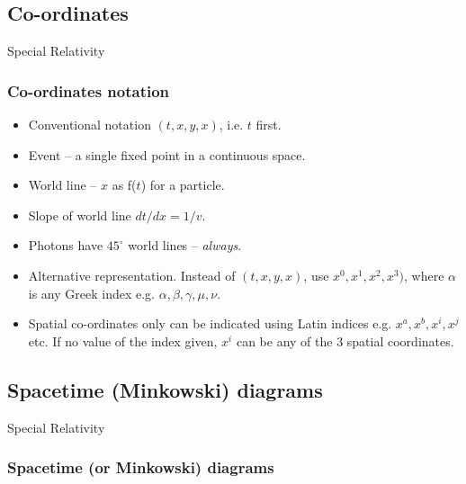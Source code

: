 \documentclass[xcolor=x11names,compress]{beamer}
\renewcommand{\(}{\begin{columns}}
\renewcommand{\)}{\end{columns}}
\newcommand{\<}[1]{\begin{column}{#1}}
\renewcommand{\>}{\end{column}}
\begin{document}
\subsection{Co-ordinates}
\begin{frame}{Special Relativity}
\frametitle{Co-ordinates notation}
\begin{itemize}
\item Conventional notation $(t,x,y,x)$, i.e. $t$ first.
\item Event -- a single fixed point
in a continuous space.
\item World line -- $x$ as f($t$) for a particle.  
\item Slope of world line $dt/dx = 1/v$.
\item Photons have $45^{\circ}$ world lines --  {\em always}.
\item Alternative representation.  Instead of $(t,x,y,x)$, use
$x^0, x^1, x^2, x^3)$, where $\alpha$ is any Greek 
index e.g. $\alpha, \beta, \gamma, \mu, \nu$.
\item Spatial co-ordinates only can be indicated using Latin indices
e.g. $x^a, x^b, x^i, x^j$ etc.  If no value of the index given, $x^i$ can
be any of the 3 spatial coordinates.
\end{itemize}
\end{frame}

\subsection{Spacetime (Minkowski) diagrams}
\begin{frame}{Special Relativity}
\frametitle{Spacetime (or Minkowski) diagrams}

\begin{center} 
\end{center}

\end{frame}
\end{document}
